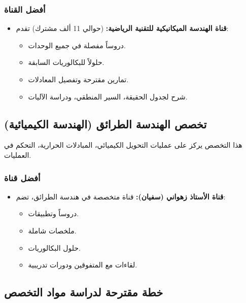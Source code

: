 \documentclass[12pt,a4paper]{book}
\begin{document}
\subsubsection{أفضل القناة}

\begin{itemize}
	\item \textbf{قناة الهندسة الميكانيكية للتقنية الرياضية:} (حوالي 11 ألف مشترك) تقدم:
	\begin{itemize}
		\item دروساً مفصلة في جميع الوحدات.
		\item حلولاً للبكالوريات السابقة.
		\item تمارين مقترحة وتفصيل المعادلات.
		\item شرح لجدول الحقيقة، السير المنطقي، ودراسة الآليات.
	\end{itemize}
\end{itemize}

\subsection{تخصص الهندسة الطرائق (الهندسة الكيميائية)}

هذا التخصص يركز على عمليات التحويل الكيميائي، المبادلات الحرارية، التحكم في العمليات.

\subsubsection{أفضل قناة}

\begin{itemize}
	\item \textbf{قناة الأستاذ زهواني (سفيان):} قناة متخصصة في هندسة الطرائق، تضم:
	\begin{itemize}
		\item دروساً وتطبيقات.
		\item ملخصات شاملة.
		\item حلول البكالوريات.
		\item لقاءات مع المتفوقين ودورات تدريبية.
	\end{itemize}
\end{itemize}

\subsection{خطة مقترحة لدراسة مواد التخصص}
\end{document}
